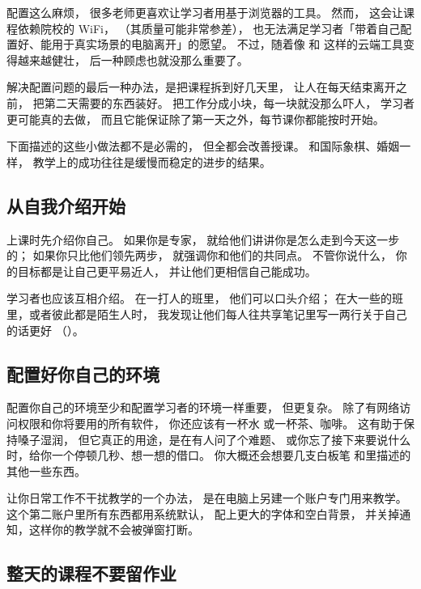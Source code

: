 配置这么麻烦，
很多老师更喜欢让学习者用基于浏览器的工具。
然而，
这会让课程依赖院校的 WiFi，
（其质量可能非常参差），
也无法满足学习者「带着自己配置好、能用于真实场景的电脑离开」的愿望。
不过，随着像 
和  这样的云端工具变得越来越健壮，
后一种顾虑也就没那么重要了。

解决配置问题的最后一种办法，是把课程拆到好几天里，
让人在每天结束离开之前，
把第二天需要的东西装好。
把工作分成小块，每一块就没那么吓人，
学习者更可能真的去做，
而且它能保证除了第一天之外，每节课你都能按时开始。


下面描述的这些小做法都不是必需的，
但全都会改善授课。
和国际象棋、婚姻一样，
教学上的成功往往是缓慢而稳定的进步的结果。

\subsection*{从自我介绍开始}

上课时先介绍你自己。
如果你是专家，
就给他们讲讲你是怎么走到今天这一步的；
如果你只比他们领先两步，
就强调你和他们的共同点。
不管你说什么，
你的目标都是让自己更平易近人，
并让他们更相信自己能成功。

学习者也应该互相介绍。
在一打人的班里，
他们可以口头介绍；
在大一些的班里，或者彼此都是陌生人时，
我发现让他们每人往共享笔记里写一两行关于自己的话更好
（）。

\subsection*{配置好你自己的环境}

配置你自己的环境至少和配置学习者的环境一样重要，
但更复杂。
除了有网络访问权限和你将要用的所有软件，
你还应该有一杯水
或一杯茶、咖啡。
这有助于保持嗓子湿润，
但它真正的用途，是在有人问了个难题、
或你忘了接下来要说什么时，给你一个停顿几秒、想一想的借口。
你大概还会想要几支白板笔
和里描述的其他一些东西。

让你日常工作不干扰教学的一个办法，
是在电脑上另建一个账户专门用来教学。
这个第二账户里所有东西都用系统默认，
配上更大的字体和空白背景，
并关掉通知，这样你的教学就不会被弹窗打断。

\subsection*{整天的课程不要留作业}

